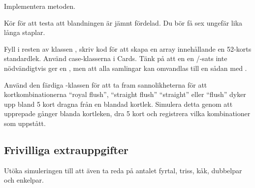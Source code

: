 \Subtask Implementera metoden.

\Subtask Kör  för att testa att blandningen är jämnt fördelad. Du bör få sex ungefär lika långa staplar.

\Task Fyll i resten av klassen , skriv kod för att skapa en array innehållande en 52-korts standardlek. Använd case-klasserna i Cards. Tänk på att en en /-sats inte nödvändigtvis ger en , men att alla samlingar kan omvandlas till en sådan med .

\Task Använd den färdiga -klassen för att ta fram sannolikheterna för att kortkombinationerna ``royal flush'', ``straight flush'' ``straight'' eller ``flush'' dyker upp bland 5 kort dragna från en blandad kortlek. Simulera detta genom att upprepade gånger blanda kortleken, dra 5 kort och registrera vilka kombinationer som uppstått. 

\subsection{Frivilliga extrauppgifter}

\Task Utöka simuleringen till att även ta reda på antalet fyrtal, triss, kåk, dubbelpar och enkelpar.
